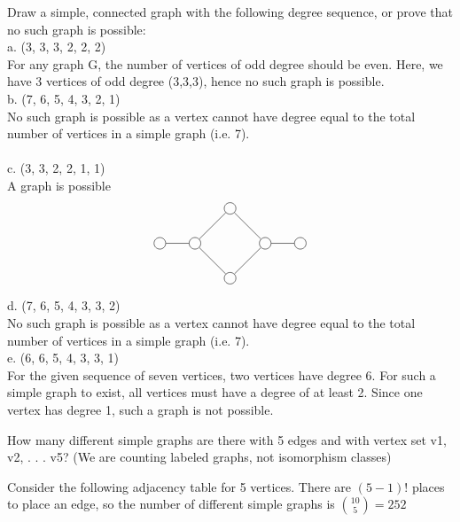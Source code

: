 \documentclass[12pt]{article}
\newenvironment{question}[2][Question]{\begin{trivlist}
\item[\hskip \labelsep {\bfseries #1}\hskip \labelsep {\bfseries #2.}]}{\end{trivlist}}
\begin{document}
\begin{question}{6}
Draw a simple, connected graph with the following degree sequence, or prove that no such graph
is possible: \\
a. (3, 3, 3, 2, 2, 2) \\
For any graph G, the number of vertices of odd degree should be even. Here, we have 3 vertices of odd degree (3,3,3), hence no such graph is possible. \\
b. (7, 6, 5, 4, 3, 2, 1) \\
No such graph is possible as a vertex cannot have degree equal to the total number of vertices in a simple graph (i.e. 7). \\ \\
c. (3, 3, 2, 2, 1, 1) \\
A graph is possible \\
\begin{align*}
\begin{tikzpicture}
\node[shape=circle,draw=black] (A) at (-1,0) {};
\node[shape=circle,draw=black] (B) at (0,1) {};
\node[shape=circle,draw=black] (C) at (1,0) {};
\node[shape=circle,draw=black] (D) at (0,-1) {};
\node[shape=circle,draw=black] (E) at (-2,0) {};
\node[shape=circle,draw=black] (F) at (2,0) {};
\path [] (A) edge node[left] {} (B);
\path [] (B) edge node[left] {} (C);
\path [] (C) edge node[left] {} (D);
\path [] (D) edge node[left] {} (A);
\path [] (A) edge node[left] {} (E);
\path [] (C) edge node[left] {} (F);
\end{tikzpicture}
\end{align*}
d. (7, 6, 5, 4, 3, 3, 2) \\
No such graph is possible as a vertex cannot have degree equal to the total number of vertices in a simple graph (i.e. 7). \\
e. (6, 6, 5, 4, 3, 3, 1)\\
For the given sequence of seven vertices, two vertices have degree 6. For such a simple graph to exist, all vertices must have a degree of at least 2. Since one vertex has degree 1, such a graph is not possible.
\end{question}

\begin{question}{7}
 How many different simple graphs are there with 5 edges and with vertex set {v1, v2, . . . v5}?
(We are counting labeled graphs, not isomorphism classes)
\end{question}

Consider the following adjacency table for 5 vertices. There are $(5-1)!$ places to place an edge, so the number of different simple graphs is ${10 \choose 5}= 252$
\end{document}
